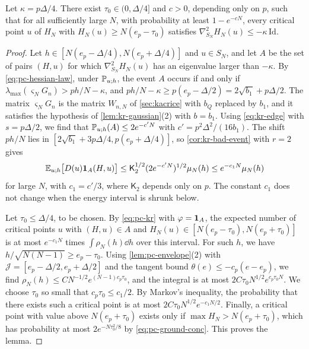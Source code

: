 \begin{lemma}\label{lem:pc-hessian}
Let $\kappa=p\Delta/4$. There exist $\tau_0\in(0,\Delta/4]$ and $c>0$, depending only on $p$, such that for all sufficiently large $N$, with probability at least $1-e^{-cN}$, every critical point $u$ of $H_N$ with $H_N(u)\ge N(e_p-\tau_0)$ satisfies $\nabla^2_{S_N}H_N(u)\le-\kappa\,\mathrm{Id}$.
\end{lemma}

\begin{proof}
Let $h\in[N(e_p-\Delta/4),N(e_p+\Delta/4)]$ and $u\in S_N$, and let $A$ be the set of pairs $(H,u)$ for which $\nabla^2_{S_N}H_N(u)$ has an eigenvalue larger than $-\kappa$. By \eqref{eq:pc-hessian-law}, under $\mathbb P_{u;h}$, the event $A$ occurs if and only if $\lambda_{\max}(\varsigma_NG_n)>ph/N-\kappa$, and $ph/N-\kappa\ge p(e_p-\Delta/2)=2\sqrt{b_1}+p\Delta/2$. The matrix $\varsigma_NG_n$ is the matrix $W_{n,N}$ of \cref{sec:kacrice} with $b_Q$ replaced by $b_1$, and it satisfies the hypothesis of \cref{lem:kr-gaussian}(2) with $b=b_1$. Using \eqref{eq:kr-edge} with $s=p\Delta/2$, we find that $\mathbb P_{u;h}(A)\le2e^{-c'N}$ with $c'=p^2\Delta^2/(16b_1)$. The shift $ph/N$ lies in $[2\sqrt{b_1}+3p\Delta/4,p(e_p+\Delta/4)]$, so \cref{cor:kr-bad-event} with $r=2$ gives
\[
\mathbb E_{u;h}\bigl[D(u)\mathbf 1_A(H,u)\bigr]\le\mathsf K_2^{1/2}(2e^{-c'N})^{1/2}\mu_N(h)\le e^{-c_1N}\mu_N(h)
\]
for large $N$, with $c_1=c'/3$, where $\mathsf K_2$ depends only on $p$. The constant $c_1$ does not change when the energy interval is shrunk below.

Let $\tau_0\le\Delta/4$, to be chosen. By \eqref{eq:pc-kr} with $\varphi=\mathbf 1_A$, the expected number of critical points $u$ with $(H,u)\in A$ and $H_N(u)\in[N(e_p-\tau_0),N(e_p+\tau_0)]$ is at most $e^{-c_1N}$ times $\int\rho_N(h)\dd h$ over this interval. For such $h$, we have $h/\sqrt{N(N-1)}\ge e_p-\tau_0$. Using \cref{lem:pc-envelope}(2) with $\mathcal J=[e_p-\Delta/2,e_p+\Delta/2]$ and the tangent bound $\theta(e)\le-c_p(e-e_p)$, we find $\rho_N(h)\le CN^{-1/2}e^{(N-1)c_p\tau_0}$, and the integral is at most $2C\tau_0N^{1/2}e^{c_p\tau_0N}$. We choose $\tau_0$ so small that $c_p\tau_0\le c_1/2$. By Markov's inequality, the probability that there exists such a critical point is at most $2C\tau_0N^{1/2}e^{-c_1N/2}$. Finally, a critical point with value above $N(e_p+\tau_0)$ exists only if $\max H_N>N(e_p+\tau_0)$, which has probability at most $2e^{-N\tau_0^2/8}$ by \eqref{eq:pc-ground-conc}. This proves the lemma.
\end{proof}


